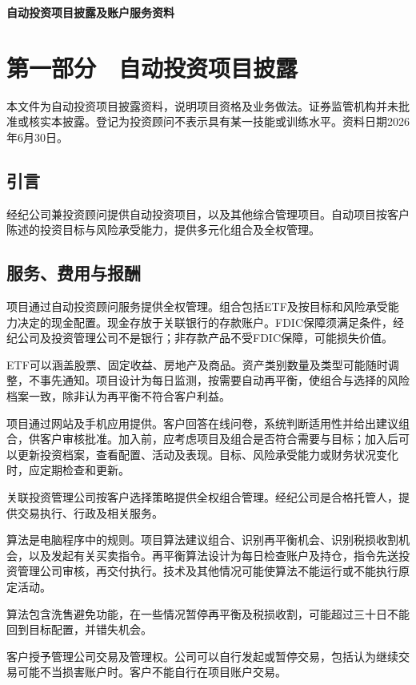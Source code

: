 \documentclass[UTF8,fontset=none,11pt,a4paper]{ctexart}
\begin{document}
{\noindent\LARGE\bfseries 自动投资项目披露及账户服务资料\par}
\vspace{10pt}
\section*{第一部分　自动投资项目披露}
本文件为自动投资项目披露资料，说明项目资格及业务做法。证券监管机构并未批准或核实本披露。登记为投资顾问不表示具有某一技能或训练水平。资料日期2026年6月30日。


\subsection*{引言}
经纪公司兼投资顾问提供自动投资项目，以及其他综合管理项目。自动项目按客户陈述的投资目标与风险承受能力，提供多元化组合及全权管理。


\subsection*{服务、费用与报酬}
项目通过自动投资顾问服务提供全权管理。组合包括ETF及按目标和风险承受能力决定的现金配置。现金存放于关联银行的存款账户。FDIC保障须满足条件，经纪公司及投资管理公司不是银行；非存款产品不受FDIC保障，可能损失价值。


ETF可以涵盖股票、固定收益、房地产及商品。资产类别数量及类型可能随时调整，不事先通知。项目设计为每日监测，按需要自动再平衡，使组合与选择的风险档案一致，除非认为再平衡不符合客户利益。


项目通过网站及手机应用提供。客户回答在线问卷，系统判断适用性并给出建议组合，供客户审核批准。加入前，应考虑项目及组合是否符合需要与目标；加入后可以更新投资档案，查看配置、活动及表现。目标、风险承受能力或财务状况变化时，应定期检查和更新。


关联投资管理公司按客户选择策略提供全权组合管理。经纪公司是合格托管人，提供交易执行、行政及相关服务。


算法是电脑程序中的规则。项目算法建议组合、识别再平衡机会、识别税损收割机会，以及发起有关买卖指令。再平衡算法设计为每日检查账户及持仓，指令先送投资管理公司审核，再交付执行。技术及其他情况可能使算法不能运行或不能执行原定活动。


算法包含洗售避免功能，在一些情况暂停再平衡及税损收割，可能超过三十日不能回到目标配置，并错失机会。


客户授予管理公司交易及管理权。公司可以自行发起或暂停交易，包括认为继续交易可能不当损害账户时。客户不能自行在项目账户交易。
\end{document}
